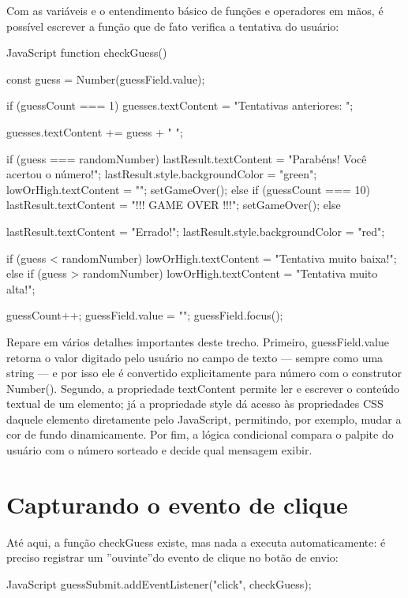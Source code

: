 Com as variáveis e o entendimento básico de funções e operadores em mãos, é possível escrever a função que de fato verifica a tentativa do usuário:

\begin{codebox}{JavaScript}
function checkGuess() {
  const guess = Number(guessField.value);

     if (guessCount === 1) {
       guesses.textContent = "Tentativas anteriores: ";
     }



     guesses.textContent += guess + " ";

     if (guess === randomNumber) {
       lastResult.textContent = "Parabéns! Você acertou o número!";
       lastResult.style.backgroundColor = "green";
       lowOrHigh.textContent = "";
       setGameOver();
     } else if (guessCount === 10) {
       lastResult.textContent = "!!! GAME OVER !!!";
       setGameOver();
     } else {
       lastResult.textContent = "Errado!";
       lastResult.style.backgroundColor = "red";

         if (guess < randomNumber) {
           lowOrHigh.textContent = "Tentativa muito baixa!";
         } else if (guess > randomNumber) {
           lowOrHigh.textContent = "Tentativa muito alta!";
         }
     }

     guessCount++;
     guessField.value = "";
     guessField.focus();
 }
\end{codebox}

Repare em vários detalhes importantes deste trecho. Primeiro, guessField.value retorna o valor digitado pelo usuário no campo de texto — sempre como uma string — e por isso ele é convertido explicitamente para número com o construtor Number(). Segundo, a propriedade textContent permite ler e escrever o conteúdo textual de um elemento; já a propriedade style dá acesso às propriedades CSS daquele elemento diretamente pelo JavaScript, permitindo, por exemplo, mudar a cor de fundo dinamicamente. Por fim, a lógica condicional compara o palpite do usuário com o número sorteado e decide qual mensagem exibir.

\section{Capturando o evento de clique}

Até aqui, a função checkGuess existe, mas nada a executa automaticamente: é preciso registrar um ”ouvinte”do evento de clique no botão de envio:

\begin{codebox}{JavaScript}
 guessSubmit.addEventListener("click", checkGuess);
\end{codebox}

